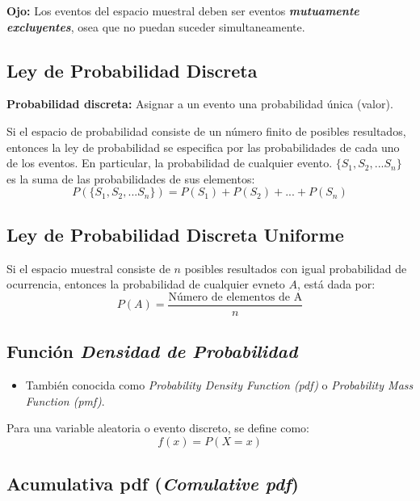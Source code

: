 \documentclass[]{book}
\providecommand{\tightlist}{%
  \setlength{\itemsep}{0pt}\setlength{\parskip}{0pt}}
\begin{document}
 \textbf{Ojo:} Los eventos del espacio muestral deben ser eventos
\textbf{\emph{mutuamente excluyentes}}, osea que no puedan suceder
simultaneamente.

\subsection{Ley de Probabilidad
Discreta}\label{ley-de-probabilidad-discreta}

\textbf{Probabilidad discreta:} Asignar a un evento una probabilidad
única (valor).

Si el espacio de probabilidad consiste de un número finito de posibles
resultados, entonces la ley de probabilidad se especifica por las
probabilidades de cada uno de los eventos. En particular, la
probabilidad de cualquier evento. \(\{S_1,S_2,...S_n\}\) es la suma de
las probabilidades de sus elementos:
\[P(\{S_1,S_2,...S_n\}) = P(S_1)+P(S_2)+...+P(S_n)\]

\subsection{Ley de Probabilidad Discreta
Uniforme}\label{ley-de-probabilidad-discreta-uniforme}

Si el espacio muestral consiste de \(n\) posibles resultados con igual
probabilidad de ocurrencia, entonces la probabilidad de cualquier evneto
\(A\), está dada por:
\[P(A)= \frac{\text{Número de elementos de A}}{n}\]

\subsection{\texorpdfstring{Función \emph{Densidad de
Probabilidad}}{Función Densidad de Probabilidad}}\label{funcion-densidad-de-probabilidad}

\begin{itemize}
\tightlist
\item
  También conocida como \emph{Probability Density Function (pdf)} o
  \emph{Probability Mass Function (pmf)}.
\end{itemize}

Para una variable aleatoria o evento discreto, se define como:
\[f(x) = P(X=x)\]

\subsection{\texorpdfstring{Acumulativa pdf (\emph{Comulative
pdf})}{Acumulativa pdf (Comulative pdf)}}\label{acumulativa-pdf-comulative-pdf}
\end{document}
